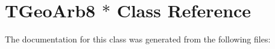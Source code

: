 \hypertarget{class_t_geo_arb8_01_5}{
\section{TGeoArb8 $\ast$ Class Reference}
\label{class_t_geo_arb8_01_5}
}


The documentation for this class was generated from the following files: